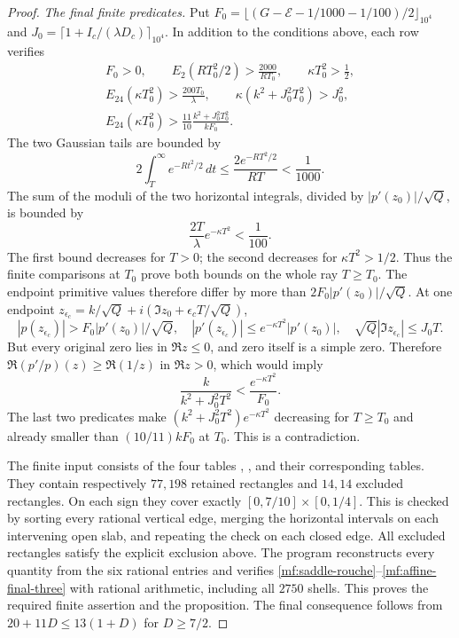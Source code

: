 \begin{proof}
\smallskip
\noindent\emph{The final finite predicates.}
Put
$F_0=\lfloor(G-\mathcal E-1/1000-1/100)/2\rfloor_{10^4}$
and $J_0=\lceil1+I_c/(\lambda D_c)\rceil_{10^4}$.
In addition to the conditions above, each row verifies
\begin{gather}
 F_0>0,\qquad
 E_2(RT_0^2/2)>\frac{2000}{RT_0},\qquad
 \kappa T_0^2>\frac12,\label{mf:affine-final-one}\\
 E_{24}(\kappa T_0^2)>\frac{200T_0}{\lambda},\qquad
 \kappa(k^2+J_0^2T_0^2)>J_0^2,\label{mf:affine-final-two}\\
 E_{24}(\kappa T_0^2)>
       \frac{11}{10}\frac{k^2+J_0^2T_0^2}{kF_0}.
 \label{mf:affine-final-three}
\end{gather}
The two Gaussian tails are bounded by
\[
 2\int_T^\infty e^{-Rt^2/2}\,dt
 \le\frac{2e^{-RT^2/2}}{RT}<\frac1{1000}.
\]
The sum of the moduli of the two horizontal integrals, divided by
$|p'(z_0)|/\sqrt Q$, is bounded by
\[
 \frac{2T}{\lambda}e^{-\kappa T^2}<\frac1{100}.
\]
The first bound decreases for $T>0$; the second decreases for
$\kappa T^2>1/2$. Thus the finite comparisons at $T_0$ prove both
bounds on the whole ray $T\ge T_0$.
The endpoint primitive values therefore differ by more than
$2F_0|p'(z_0)|/\sqrt Q$. At one endpoint
$z_{\epsilon_c}=k/\sqrt Q+i(\Im z_0+\epsilon_c T/\sqrt Q)$,
\[
 |p(z_{\epsilon_c})|>F_0|p'(z_0)|/\sqrt Q,\quad
 |p'(z_{\epsilon_c})|\le e^{-\kappa T^2}|p'(z_0)|,\quad
 \sqrt Q|\Im z_{\epsilon_c}|\le J_0T.
\]
But every original zero lies in $\Re z\le0$, and zero itself
is a simple zero. Therefore
$\Re(p'/p)(z)\ge\Re(1/z)$ in $\Re z>0$, which would imply
\[
 \frac{k}{k^2+J_0^2T^2}<\frac{e^{-\kappa T^2}}{F_0}.
\]
The last two predicates make
$(k^2+J_0^2T^2)e^{-\kappa T^2}$ decreasing for $T\ge T_0$
and already smaller than $(10/11)kF_0$ at $T_0$.
This is a contradiction.

The finite input consists of the four tables
,
,
and their corresponding  tables.
They contain respectively $77,198$ retained rectangles and
$14,14$ excluded rectangles. On each sign they cover exactly
$[0,7/10]\times[0,1/4]$. This is checked by sorting every
rational vertical edge, merging the horizontal intervals on
each intervening open slab, and repeating the check on each
closed edge. All excluded rectangles satisfy the explicit
exclusion above. The program
 reconstructs every
quantity from the six rational entries and verifies
\eqref{mf:saddle-rouche}--\eqref{mf:affine-final-three}
with rational arithmetic, including all $2750$ shells.
This proves the required finite assertion and the proposition.
The final consequence follows from $20+11D\le13(1+D)$
for $D\ge7/2$.
\end{proof}

